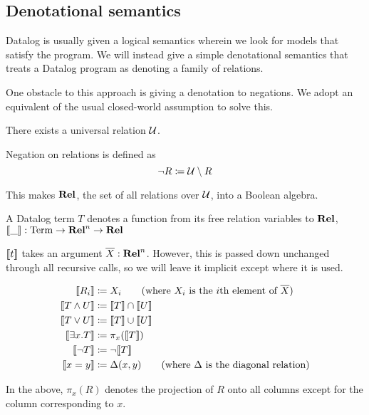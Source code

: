 \subsection{Denotational semantics}

Datalog is usually given a logical semantics wherein we look for models that
satisfy the program. We will instead give a simple denotational semantics that treats a Datalog
program as denoting a family of relations.

One obstacle to this approach is giving a denotation to negations. We adopt an
equivalent of the usual closed-world assumption to solve this.

\begin{defn}
  There exists a universal relation $\mathcal{U}$.

  Negation on relations is defined as
  \begin{displaymath}
    \neg R \coloneqq \mathcal{U} \setminus R
  \end{displaymath}
\end{defn}

This makes $\mathbf{Rel}$, the set of all relations over $\mathcal{U}$, into a Boolean algebra.

\begin{defn}
  A Datalog term $T$ denotes a function from its free relation variables to
  $\mathbf{Rel}$, $\llbracket \_ \rrbracket : \mathrm{Term} \rightarrow \mathbf{Rel}^n \rightarrow \mathbf{Rel}$

  $\llbracket t \rrbracket$ takes an argument $\overline{X} : \mathbf{Rel}^n$. However, this is
  passed down unchanged through all recursive calls, so we will leave it
  implicit except where it is used.

  \begin{align*}
    \denote{R_i} &\defeq X_i \tag{where $X_i$ is the $i$th element of $\overline{X}$}\\
    \denote{T \wedge U} &\defeq \denote{T} \cap \denote{U}\\
    \denote{T \vee U} &\defeq \denote{T} \cup \denote{U}\\
    \denote{\exists x. T} &\defeq \pi_x(\denote{T})\\
    \denote{\neg T} &\defeq \neg \denote{T}\\
    \denote{x=y} &\defeq \Delta(x, y) \tag{where $\Delta$ is the diagonal relation}
  \end{align*}
\end{defn}

In the above, $\pi_x(R)$ denotes the projection of $R$ onto all columns except for the column corresponding to $x$.

